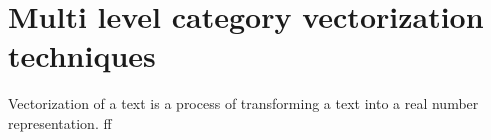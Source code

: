 
\chapter{Multi level category vectorization techniques}

Vectorization of a text is a process of transforming a text into a real number representation. ff